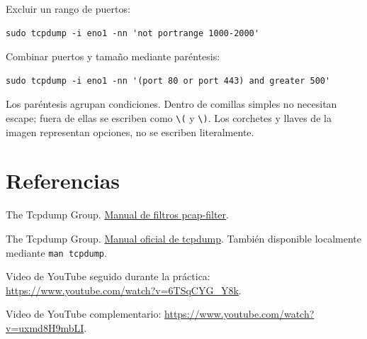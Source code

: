 \documentclass[12pt,a4paper]{article}
\begin{document}
Excluir un rango de puertos:
\begin{verbatim}
sudo tcpdump -i eno1 -nn 'not portrange 1000-2000'
\end{verbatim}

Combinar puertos y tamaño mediante paréntesis:
\begin{verbatim}
sudo tcpdump -i eno1 -nn '(port 80 or port 443) and greater 500'
\end{verbatim}

Los paréntesis agrupan condiciones. Dentro de comillas simples no necesitan escape; fuera de ellas se escriben como \verb|\(| y \verb|\)|. Los corchetes y llaves de la imagen representan opciones, no se escriben literalmente.

\newpage
\section{Referencias}
The Tcpdump Group. \href{https://github.com/the-tcpdump-group/libpcap/blob/master/pcap-filter.manmisc.in}{Manual de filtros pcap-filter}.
\par
The Tcpdump Group. \href{https://github.com/the-tcpdump-group/tcpdump/blob/master/tcpdump.1.in}{Manual oficial de tcpdump}. También disponible localmente mediante \texttt{man tcpdump}.
\par Video de YouTube seguido durante la práctica: \url{https://www.youtube.com/watch?v=6TSqCYG_Y8k}.
\par Video de YouTube complementario: \url{https://www.youtube.com/watch?v=uxmd8H9mbLI}.
\end{document}
